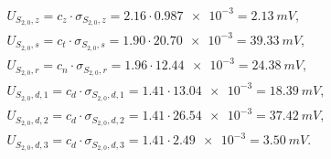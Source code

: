 \begin{gather}
U_{S_{2,0},z} = c_{z} \cdot \sigma_{S_{2,0},z} = 2.16 \cdot \num{0.987e-3} = \qty{2.13}{mV} \label{eq:sym_partd_output_unc_roun_S_2_0},\\
U_{S_{2,0},s} = c_{t} \cdot \sigma_{S_{2,0},s} = 1.90 \cdot \num{20.70e-3} = \qty{39.33}{mV} \label{eq:sym_partd_output_unc_stat_S_2_0}, \\
U_{S_{2,0},r} = c_{n} \cdot \sigma_{S_{2,0},r} = 1.96 \cdot \num{12.44e-3} = \qty{24.38}{mV} \label{eq:sym_partd_output_unc_rand_S_2_0}, \\
U_{S_{2,0},d,1} = c_{d} \cdot \sigma_{S_{2,0},d,1} = 1.41 \cdot \num{13.04e-3} = \qty{18.39}{mV} \label{eq:sym_partd_output_unc_dyn_1_S_2_0}, \\
U_{S_{2,0},d,2} = c_{d} \cdot \sigma_{S_{2,0},d,2} = 1.41 \cdot \num{26.54e-3} = \qty{37.42}{mV} \label{eq:sym_partd_output_unc_dyn_2_S_2_0}, \\
U_{S_{2,0},d,3} = c_{d} \cdot \sigma_{S_{2,0},d,3} = 1.41 \cdot \num{2.49e-3} = \qty{3.50}{mV} \label{eq:sym_partd_output_unc_dyn_3_S_2_0}.
\end{gather}

